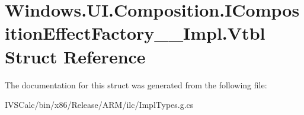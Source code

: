 \hypertarget{struct_windows_1_1_u_i_1_1_composition_1_1_i_composition_effect_factory_____impl_1_1_vtbl}{}\section{Windows.\+U\+I.\+Composition.\+I\+Composition\+Effect\+Factory\+\_\+\+\_\+\+Impl.\+Vtbl Struct Reference}
\label{struct_windows_1_1_u_i_1_1_composition_1_1_i_composition_effect_factory_____impl_1_1_vtbl}


The documentation for this struct was generated from the following file\+:\begin{DoxyCompactItemize}
\item 
I\+V\+S\+Calc/bin/x86/\+Release/\+A\+R\+M/ilc/Impl\+Types.\+g.\+cs\end{DoxyCompactItemize}
